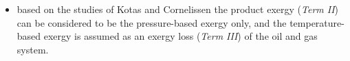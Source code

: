 \begin{itemize}
	\item based on the studies of Kotas \cite{Kotas1995} and Cornelissen \cite{Cornelissen1997} the product exergy (\emph{Term II}) can be considered to be the pressure-based exergy only, and the temperature-based exergy is assumed as an exergy loss (\emph{Term III}) of the oil and gas system. 
\end{itemize} 


